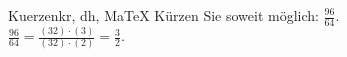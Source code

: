\begin{MAufgabe}{Kuerzen}{kr, dh, MaTeX}
K\"urzen Sie soweit m\"oglich: $\frac{96}{64}$.\\ 
\ifLsg\MLoesung
\quad $\frac{96}{64}=\frac{(32)\cdot(3)}{(32)\cdot(2)}=\frac{3}{2}$.\else\relax\fi
 \end{MAufgabe}